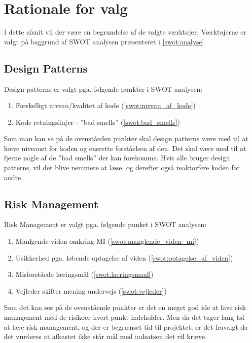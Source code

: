 \section{Rationale for valg}
I dette afsnit vil der være en begrundelse af de valgte værktøjer.
Værktøjerne er valgt på baggrund af SWOT analysen præsenteret i \cref{swot:analyse}.

\subsection{Design Patterns}\label{workshop2:designpatterns}
Design patterns er valgt pga. følgende punkter i SWOT analysen:
\begin{enumerate}
\item Forskelligt niveau/kvalitet af kode (\cref{swot:niveau_af_kode})
\item Kode retningslinjer - ''bad smells'' (\cref{swot:bad_smells})
\end{enumerate}

Som man kan se på de ovenståeden punkter skal design patterns være med til at hæve niveauet for koden og ensrette forståelsen af den.
Det skal være med til at fjerne nogle af de ''bad smells'' der kan forekomme.
Hvis alle bruger design patterns, vil det blive nemmere at læse, og derefter også reaktorfere koden for andre.

\subsection{Risk Management}
Risk Management er valgt pga. følgende punket i SWOT analysen:

\begin{enumerate}
\item Manlgende viden omkring MI (\cref{swot:manglende_viden_mi})
\item Usikkerhed pga. løbende optagelse af viden (\cref{swot:optagelse_af_viden})
\item Misforståede læringsmål (\cref{swot:laeringsmaal})
\item Vejleder skifter mening undervejs (\cref{swot:vejleder})
\end{enumerate}

Som det kan ses på de ovenstående punkter er det en meget god ide at lave risk management med de risikoer hvert punkt indeholder.
Men da det tager lang tid at lave risk management, og der er begrænset tid til projektet, er det fravalgt da det vurderes at afkastet ikke står mål med indsatsen det vil kræve.